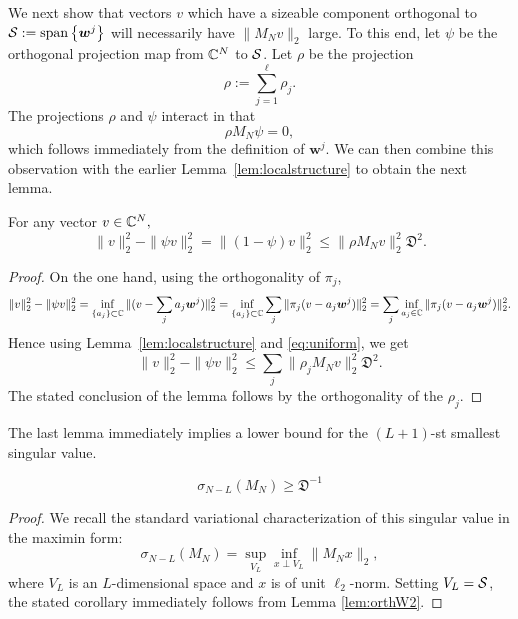 \documentclass{amsart}
\numberwithin{equation}{section}
\def\corAB{}
\begin{document}
 \corAB{We next show that vectors $v$
   which have a sizeable component orthogonal
to $\mathcal{S}:= \operatorname{span}\left\{ {\bm w}^j \right\}$ will necessarily
have $\|M_N v\|_2$ large.} To this end, let $\psi$ be the orthogonal projection map from $\mathbb{C}^N$ to \corAB{$\mathcal{S}$}. Let $\rho$ be the projection
\begin{equation}
  \label{eq-rho}\rho := \sum_{j=1}^\ell \corAB{\rho_j}.
\end{equation}
The projections $\rho$ and $\psi$ interact in that
\begin{equation}
  \rho M_N \psi = 0,
  \label{eq:rhogood}
\end{equation}
which follows immediately from the definition of ${\bm w}^j.$
We can then combine this observation with the earlier
Lemma~\ref{lem:localstructure} to obtain the next lemma.
%
\begin{lemma}
  For any vector $v \in \mathbb{C}^N,$
  \[
    \|v\|^2_2 - \|\psi v\|^2_2
    =
    \|(1-\psi)v\|^2_2
    \leq \| \rho M_N v\|^2_2 \mathfrak{D}^2.
  \]
  \label{lem:orthW2}
\end{lemma}
\begin{proof}
  On the one hand, using the orthogonality of $\pi_j$,
  \begin{align*}
    \|v\|^2_2-\|\psi v\|^2_2
    = \inf_{\{a_j\} \subset \mathbb{C}} \| (v - \sum_j a_j {\bm w}^j)\|^2_2 = \inf_{\{a_j\} \subset \mathbb{C}} \sum_j \| \pi_j(v - a_j {\bm w}^j)\|^2_2 = \sum_j \inf_{a_j \in\mathbb{C}} \| \pi_j(v - a_j {\bm w}^j)\|^2_2.
  \end{align*}
  Hence using Lemma~\ref{lem:localstructure} and \eqref{eq:uniform}, we get
  \[
    \|v\|^2_2-\|\psi v\|^2_2
    \leq \sum_j \|\corAB{\rho_j} M_N v\|^2_2\mathfrak{D}^2.
  \]
 The stated conclusion of the lemma follows
  by the orthogonality of the $\corAB{\rho_j}$.
\end{proof}
The last lemma
immediately implies a lower bound for the $(\corAB{L}+1)$-st smallest singular value.
\begin{corollary}
  \label{cor:lb}
  \[
    \sigma_{N-\corAB{L}}(M_N) \geq \mathfrak{D}^{-1}
  \]
\end{corollary}
\begin{proof}
 We recall the standard variational characterization of this singular value in the maximin form:
\begin{equation*}
  \sigma_{N-\corAB{L}}(M_N) = \sup_{V_{\corAB{L}}} \inf_{x \perp V_{\corAB{L}}} \|M_Nx\|_2,
\end{equation*}
where $V_{\corAB{L}}$ is an $\corAB{L}$-dimensional space and $x$ is of unit $\ell_2$-norm. \corAB{Setting $V_L=\mathcal{S}$, the stated corollary immediately follows from} Lemma \ref{lem:orthW2}.
\end{proof}
\end{document}
